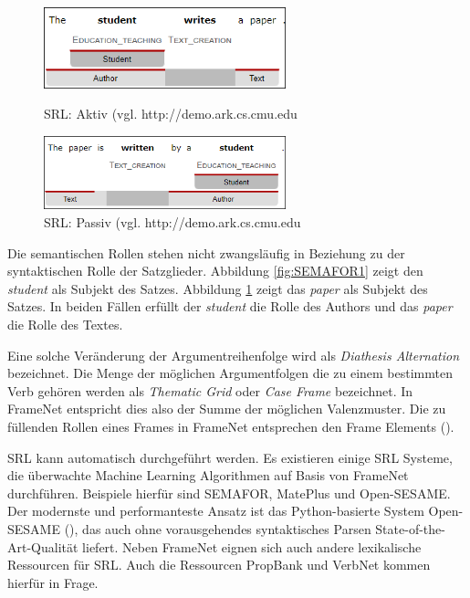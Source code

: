\begin{figure}
\includegraphics[width=7cm]{pictures/SEMAFOR1.png}
\caption{SRL: Aktiv (vgl. http://\-demo.\-ark.\-cs.\-cmu.edu\)}
\label{fig:SEMAFOR1}
\includegraphics[width=7cm]{pictures/SEMAFOR2.png}
\caption{SRL: Passiv (vgl. http://\-demo\-.ark\-.cs\-.cmu\-.edu\)}
\label{fig:SEMAFOR2}
\end{figure}
Die semantischen Rollen stehen nicht zwangsläufig in Beziehung zu der syntaktischen Rolle der Satzglieder. Abbildung  \ref{fig:SEMAFOR1} zeigt den \textit{student} als Subjekt des Satzes. Abbildung \ref{fig:SEMAFOR2} zeigt das \textit{paper} als Subjekt des Satzes.
In beiden Fällen erfüllt der \textit{student} die Rolle des Authors und das \textit{paper} die Rolle des Textes.
\par
Eine solche Veränderung der Argumentreihenfolge wird als \textit{Diathesis Alternation} bezeichnet. Die Menge der möglichen Argumentfolgen die zu einem bestimmten Verb gehören werden als \textit{Thematic Grid} oder \textit{Case Frame} bezeichnet. In FrameNet entspricht dies also der Summe der möglichen Valenzmuster. Die zu füllenden Rollen eines Frames in FrameNet entsprechen den Frame Elements (\cite[vgl.][383]{JURAFSKY}).
\par
\ac{SRL} kann automatisch durchgeführt werden. Es existieren einige \ac{SRL} Systeme, die überwachte Machine Learning Algorithmen auf Basis von FrameNet durchführen. Beispiele hierfür sind SEMAFOR, MatePlus und Open-SESAME. Der modernste und performanteste Ansatz ist das Python-basierte System Open-SESAME (\cite[vgl.][8]{SWAYAMDIPTA}), das auch ohne vorausgehendes syntaktisches Parsen State-of-the-Art-Qualität liefert.
Neben FrameNet eignen sich auch andere lexikalische Ressourcen für \ac{SRL}. Auch die Ressourcen PropBank und VerbNet kommen hierfür in Frage.

